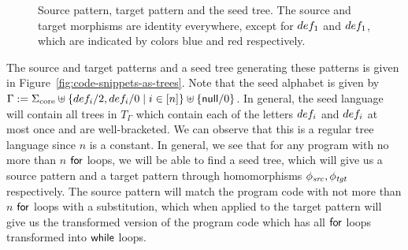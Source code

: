 \begin{figure}
{} 
    \caption{Source pattern, target pattern and the seed tree. The source and target morphisms are identity everywhere, except for $def_1$ and $def_1$, which are indicated by colors blue and red respectively.}
\end{figure}
 
The source and target patterns and a seed tree generating these patterns is given in Figure~\ref{fig:code-snippets-as-trees}. Note that the seed alphabet is given by $\Gamma := \Sigma_\text{core} \uplus \left\{ def_i/2, def_i/0 \mid i \in [n] \right\} \uplus \left\{ \mathsf{null}/0 \right\}$. In general, the seed language will contain all trees in $T_{\Gamma}$ which contain each of the letters $def_i$ and $def_i$ at most once and are well-bracketed. We can observe that this is a regular tree language since $n$ is a constant. In general, we see that for any program with no more than $n$ $\mathsf{for}$ loops, we will be able to find a seed tree, which will give us a source pattern and a target pattern through homomorphisms $\phi_{\mathit{src}}, \phi_{\mathit{tgt}}$ respectively. The source pattern will match the program code with not more than $n$ $\mathsf{for}$ loops with a substitution, which when applied to the target pattern will give us the transformed version of the program code which has all $\mathsf{for}$ loops transformed into $\mathsf{while}$ loops. 

